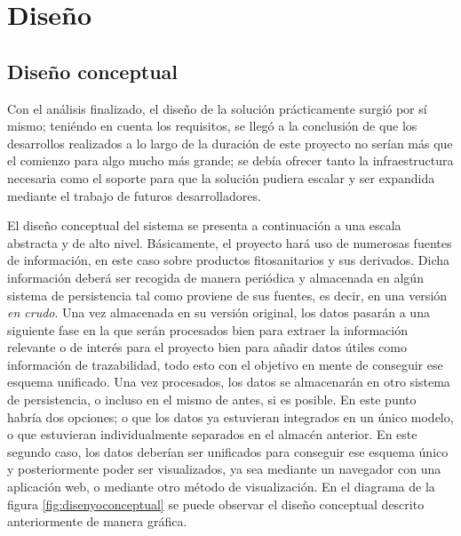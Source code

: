 \chapter{Diseño}  \label{disenyo}
\section{Diseño conceptual} \label{disenyo.conceptual}


Con el análisis finalizado, el diseño de la solución prácticamente surgió por sí mismo; teniéndo en cuenta los requisitos, se llegó a la conclusión de que los desarrollos realizados a lo largo de la duración de este proyecto no serían más que el comienzo para algo mucho más grande; se debía ofrecer tanto la infraestructura necesaria como el soporte para que la solución pudiera escalar y ser expandida mediante el trabajo de futuros desarrolladores. 
\par 
El diseño conceptual del sistema se presenta a continuación a una escala abstracta y de alto nivel. Básicamente, el proyecto hará uso de numerosas fuentes de información, en este caso sobre productos fitosanitarios y sus derivados. Dicha información deberá ser recogida de manera periódica y almacenada en algún sistema de persistencia tal como proviene de sus fuentes, es decir, en una versión \textit{en crudo}. Una vez almacenada en su versión original, los datos pasarán a una siguiente fase en la que serán procesados bien para extraer la información relevante o de interés para el proyecto bien para añadir datos útiles como información de trazabilidad, todo esto con el objetivo en mente de conseguir ese esquema unificado. Una vez procesados, los datos se almacenarán en otro sistema de persistencia, o incluso en el mismo de antes, si es posible. En este punto habría dos opciones; o que los datos ya estuvieran integrados en un único modelo, o que estuvieran individualmente separados en el almacén anterior. En este segundo caso, los datos deberían ser unificados para conseguir ese esquema único y posteriormente poder ser visualizados, ya sea mediante un navegador con una aplicación web, o mediante otro método de visualización. En el diagrama de la figura \ref{fig:disenyoconceptual} se puede observar el diseño conceptual descrito anteriormente de manera gráfica. 


